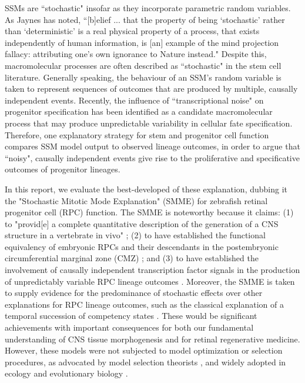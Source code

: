 SSMs are ``stochastic" insofar as they incorporate parametric random variables. As Jaynes has noted, ``[b]elief ... that the property of being ‘stochastic' rather than ‘deterministic' is a real physical property of a process, that exists independently of human information, is [an] example of the mind projection fallacy: attributing one’s own ignorance to Nature instead." \cite[pp.506]{Jaynes2003} Despite this, macromolecular processes are often described as ``stochastic" in the stem cell literature. Generally speaking, the behaviour of an SSM's random variable is taken to represent sequences of outcomes that are produced by multiple, causally independent events. Recently, the influence of ``transcriptional noise" on progenitor specification has been identified as a candidate macromolecular process that may produce unpredictable variability in cellular fate specification. Therefore, one explanatory strategy for stem and progenitor cell function compares SSM model output to observed lineage outcomes, in order to argue that ``noisy", causally independent events give rise to the proliferative and specificative outcomes of progenitor lineages.

In this report, we evaluate the best-developed of these explanation, dubbing it the "Stochastic Mitotic Mode Explanation" (SMME) for zebrafish retinal progenitor cell (RPC) function. The SMME is noteworthy because it claims: (1) to "provid[e] a complete quantitative description of the generation of a CNS structure in a vertebrate in vivo" \cite{He2012}; (2) to have established the functional equivalency of embryonic RPCs and their descendants in the postembryonic circumferential marginal zone (CMZ) \cite{Wan2016}; and (3) to have established the involvement of causally independent transcription factor signals in the production of unpredictably variable RPC lineage outcomes \cite{Boije2015}. Moreover, the SMME is taken to supply evidence for the predominance of stochastic effects over other explanations for RPC lineage outcomes, such as the classical explanation of a temporal succession of competency states \cite{Temple1986}. These would be significant achievements with important consequences for both our fundamental understanding of CNS tissue morphogenesis and for retinal regenerative medicine. However, these models were not subjected to model optimization or selection procedures, as advocated by model selection theorists \cite{Burnham2002}, and widely adopted in ecology and evolutionary biology \cite{Johnson2004}.

